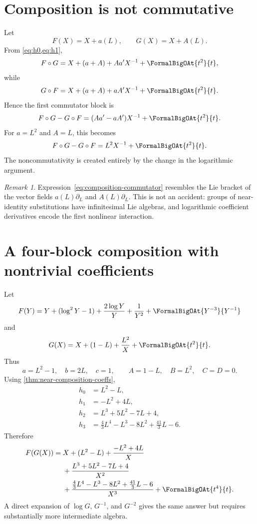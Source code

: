 \documentclass[11pt,openany]{book}
\theoremstyle{definition}
\theoremstyle{plain}
\theoremstyle{remark}
\newtheorem{remark}{Remark}[chapter]
\newcommand{\compose}{\mathbin{\circ}}
\begin{document}
\section{Composition is not commutative}
Let
\[
 F(X)=X+a(L),
 \qquad
 G(X)=X+A(L).
\]
From \cref{eq:h0,eq:h1},
\[
 F\compose G
 =X+(a+A)+Aa'X^{-1}+\FormalBigOAt{t^2}{t},
\]
while
\[
 G\compose F
 =X+(a+A)+aA'X^{-1}+\FormalBigOAt{t^2}{t}.
\]
Hence the first commutator block is
\begin{equation}\label{eq:composition-commutator}
 F\compose G-G\compose F
 =(Aa'-aA')X^{-1}+\FormalBigOAt{t^2}{t}.
\end{equation}
For \(a=L^2\) and \(A=L\), this becomes
\[
 F\compose G-G\compose F=L^2X^{-1}+\FormalBigOAt{t^2}{t}.
\]
The noncommutativity is created entirely by the change in the logarithmic
argument.

\begin{remark}
Expression~\eqref{eq:composition-commutator} resembles the Lie bracket of the
vector fields \(a(L)\partial_L\) and \(A(L)\partial_L\).  This is not an
accident: groups of near-identity substitutions have infinitesimal Lie
algebras, and logarithmic coefficient derivatives encode the first nonlinear
interaction.
\end{remark}

\section{A four-block composition with nontrivial coefficients}
Let
\[
 F(Y)=Y+(\log^2Y-1)+\frac{2\log Y}{Y}+\frac1{Y^2}
 +\FormalBigOAt{Y^{-3}}{Y^{-1}}
\]
and
\[
 G(X)=X+(1-L)+\frac{L^2}{X}+\FormalBigOAt{t^2}{t}.
\]
Thus
\[
 a=L^2-1,
 \quad b=2L,
 \quad c=1,
 \qquad
 A=1-L,
 \quad B=L^2,
 \quad C=D=0.
\]
Using \cref{thm:near-composition-coeffs},
\begin{align*}
 h_0&=L^2-L,\\
 h_1&=-L^2+4L,\\
 h_2&=L^3+5L^2-7L+4,\\
 h_3&=\frac43L^4-L^3-8L^2+\frac{41}{3}L-6.
\end{align*}
Therefore
\begin{equation}\label{eq:worked-composition-four}
\begin{split}
 F(G(X))={}&X+(L^2-L)+\frac{-L^2+4L}{X}\\
 &+\frac{L^3+5L^2-7L+4}{X^2}\\
 &+\frac{\tfrac43L^4-L^3-8L^2+\tfrac{41}{3}L-6}{X^3}
 +\FormalBigOAt{t^4}{t}.
\end{split}
\end{equation}
A direct expansion of \(\log G\), \(G^{-1}\), and \(G^{-2}\) gives the same
answer but requires substantially more intermediate algebra.
\end{document}
